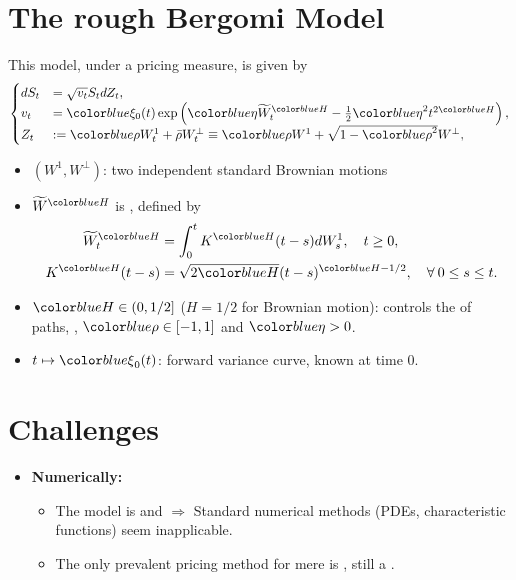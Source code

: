 \documentclass[ima, 20pt, portrait, plainboxedsections]{sciposter}
\begin{document}
\begin{multicols}{3}
\section*{The rough Bergomi Model \cite{bayer2016pricing}}
This model, under a pricing measure, is given by
\begin{equation}
\begin{cases}
	dS_t &= \sqrt{v_t} S_t dZ_t,\\
v_t &= \blue{\xi_0}(t) \exp\left( \blue{\eta} \widetilde{W}_t^{\blue{H}} - \frac{1}{2} \blue{\eta}^2 t^{2\blue{H}} \right),\\
	Z_t&:=\blue{\rho}	W^1_t+ \bar{\rho}W^\perp_t \equiv \blue{\rho} W^1+\sqrt{1-\blue{\rho}^2} W^\perp,
\end{cases}
\end{equation}
\begin{itemize}
	\item $(W^1,W^\perp)$: two independent standard Brownian motions
	\item $\widetilde{W}^\blue{H} $ is ,  defined by
	\begin{align*}
	\widetilde{W}_t^{\blue{H}} &= \int_0^t K^{\blue{H}}(t-s) dW_s^1, \quad t \ge 0, \\ 	K^{\blue{H}}(t-s) &= \sqrt{2\blue{H}} (t-s)^{\blue{H} - 1/2},\quad \forall \: 0 \le s \le t.
	\end{align*}
	\item $\blue{H} \in(0,1/2]$ ($H=1/2$ for Brownian motion): controls the  of paths, , $\blue{\rho} \in [-1,1]$  and  $\blue{\eta}>0$.
	\item $t \mapsto \blue{\xi}_0(t)$: forward variance curve, known at time $0$.
\end{itemize}
\section*{Challenges}
\begin{itemize}
\item \textbf{Numerically:}
	\begin{itemize}
		\item The model is  and  $\Rightarrow$ Standard numerical methods (PDEs, characteristic functions) seem inapplicable.
		\item The only prevalent pricing method for mere
		 is  \cite{bayer2016pricing,bayer2017regularity,mccrickerd2018turbocharging}, still a .
		

\end{itemize}
\end{itemize}
\end{multicols}
\end{document}
